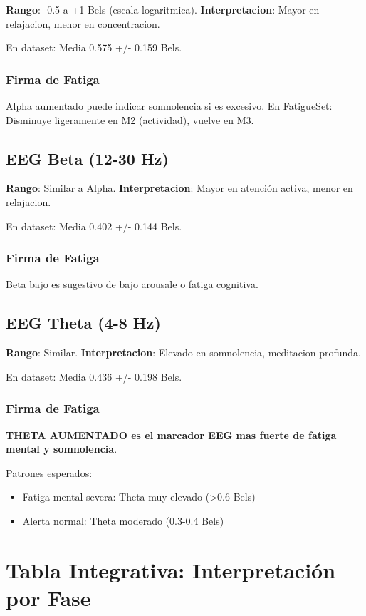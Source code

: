 \textbf{Rango}: -0.5 a +1 Bels (escala logaritmica).
\textbf{Interpretacion}: Mayor en relajacion, menor en concentracion.

En dataset: Media 0.575 +/- 0.159 Bels.

\subsubsection{Firma de Fatiga}
Alpha aumentado puede indicar somnolencia si es excesivo.
En FatigueSet: Disminuye ligeramente en M2 (actividad), vuelve en M3.

\subsection{EEG Beta (12-30 Hz)}

\textbf{Rango}: Similar a Alpha.
\textbf{Interpretacion}: Mayor en atención activa, menor en relajacion.

En dataset: Media 0.402 +/- 0.144 Bels.

\subsubsection{Firma de Fatiga}
Beta bajo es sugestivo de bajo arousale o fatiga cognitiva.

\subsection{EEG Theta (4-8 Hz)}

\textbf{Rango}: Similar.
\textbf{Interpretacion}: Elevado en somnolencia, meditacion profunda.

En dataset: Media 0.436 +/- 0.198 Bels.

\subsubsection{Firma de Fatiga}
\textbf{THETA AUMENTADO es el marcador EEG mas fuerte de fatiga mental y somnolencia}.

Patrones esperados:
\begin{itemize}
    \item Fatiga mental severa: Theta muy elevado (>0.6 Bels)
    \item Alerta normal: Theta moderado (0.3-0.4 Bels)
\end{itemize}

\section{Tabla Integrativa: Interpretación por Fase}

